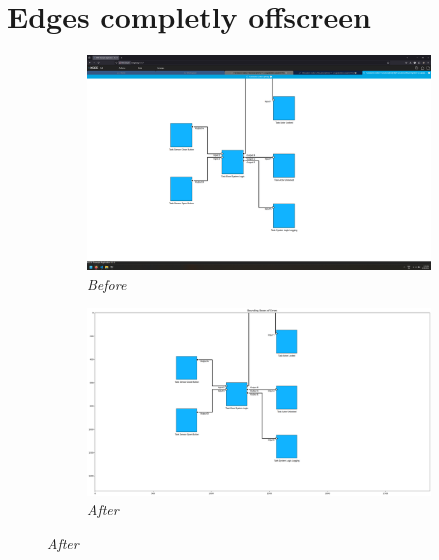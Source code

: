 \documentclass{article}
\begin{document}
\section{Edges completly offscreen}
\begin{figure}[H]
    \centering
    \begin{subfigure}[t]{0.9\textwidth}
        \centering
        \includegraphics[width=\textwidth]{testcases/edge_offscreen_completely/152114-079741_input_image.png}
        \caption*{\textit{Before}}
    \end{subfigure}
    \newline    
    \begin{subfigure}[t]{0.9\textwidth}
        \centering
        \includegraphics[width=\textwidth]{testcases/edge_offscreen_completely/152126-889602_element_bbox_errors_labeled_colored.png}
        \caption*{\textit{After}}
    \end{subfigure}
    \label{fig:edges_completly_offscreen}
\end{figure}
\newpage
\end{document}
